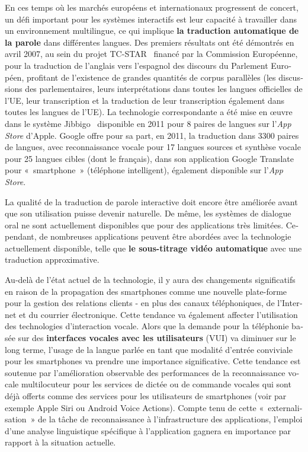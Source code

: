 \begin{french}
\begin{multicols}{2}
En ces temps où les marchés européens et internationaux progressent de
concert, un défi important pour les systèmes interactifs est leur
capacité à travailler dans un environnement multilingue, ce qui
implique {\bf la traduction automatique de la parole} dans différentes
langues. Des premiers résultats ont été démontrés en avril 2007, au
sein du projet TC-STAR~\cite{tcstarurl} financé par la Commission
Européenne, pour la traduction de l'anglais vers l'espagnol des discours du Parlement Européen, profitant de l'existence de grandes quantités de corpus parallèles (les
discussions des parlementaires, leurs interprétations dans toutes les
langues officielles de l'UE, leur transcription et la
traduction de leur transcription également dans toutes les langues de
l'UE). La technologie correspondante a été mise en œuvre dans
le système Jibbigo~\cite{jibbigo} disponible en 2011 pour 8 paires de langues
sur l'{\em {\mbox App Store}} d'Apple. Google offre
pour sa part, en 2011, la traduction dans 3300 paires de langues, avec
reconnaissance vocale pour 17 langues sources et synthèse vocale pour
25 langues cibles (dont le français), dans son application Google
Translate pour «~smartphone~» (téléphone intelligent), également
disponible sur l'{\em {\mbox App Store}}.

La qualité de la traduction de parole interactive doit encore être
améliorée avant que son utilisation puisse devenir naturelle. De même,
les systèmes de dialogue oral ne sont actuellement disponibles que
pour des applications très limitées. Cependant, de nombreuses
applications peuvent être abordées avec la technologie actuellement
disponible, telle que {\bf le sous-titrage vidéo automatique} avec une
traduction approximative.

Au-delà de l'état actuel de la technologie, il y aura des
changements significatifs en raison de la propagation des smartphones
comme une nouvelle plate-forme pour la gestion des relations clients -
en plus des canaux téléphoniques, de l'Internet et du courrier
électronique. Cette tendance va également affecter l'utilisation des technologies d'interaction vocale. Alors
que la demande pour la téléphonie basée sur des {\bf interfaces
  vocales avec les utilisateurs} (VUI) va diminuer sur le long terme,
l'usage de la langue parlée en tant que modalité d'entrée conviviale pour les smartphones va prendre une importance
significative. Cette tendance est soutenue par l'amélioration
observable des performances de la reconnaissance vocale multilocuteur
pour les services de dictée ou de commande vocales qui sont déjà
offerts comme des services pour les utilisateurs de smartphones (voir
par exemple Apple Siri ou Android Voice Actions). Compte tenu de cette
«~externalisation~» de la tâche de reconnaissance à l'infrastructure des applications, l'emploi d'une
analyse linguistique spécifique à l'application gagnera en
importance par rapport à la situation actuelle.


\end{multicols}
\end{french}
